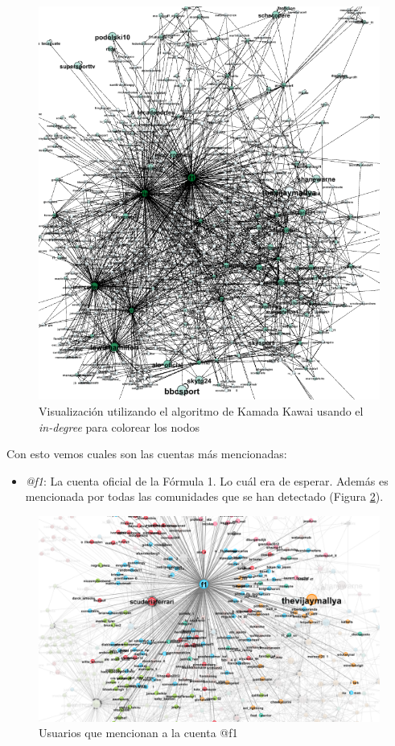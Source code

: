 \begin{figure}[H]
\centering
\includegraphics[width=14cm]{img/in-degree}
\caption{Visualización utilizando el algoritmo de Kamada Kawai usando el \textit{in-degree} para colorear los nodos}
\label{fig:in-degree}
\end{figure}

Con esto vemos cuales son las cuentas más mencionadas:

\begin{itemize}
	\item \textit{@f1}: La cuenta oficial de la Fórmula 1. Lo cuál era de esperar. Además es mencionada por todas las comunidades que se han detectado (Figura \ref{fig:f1-mentions}).
\end{itemize}

\begin{figure}[H]
	\centering
	\includegraphics[width=14cm]{img/f1-mentions}
	\caption{Usuarios que mencionan a la cuenta @f1}
	\label{fig:f1-mentions}
\end{figure}

